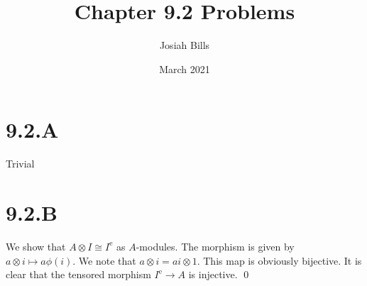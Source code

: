 \documentclass{article}
\title{Chapter 9.2 Problems}
\author{Josiah Bills}
\date{March 2021}
\begin{document}
\maketitle

\section{9.2.A}
Trivial

\section{9.2.B}
We show that $A \otimes I \cong I^{\text{e}}$ as $A$-modules. The
morphism is given by $a \otimes i \mapsto a\phi(i)$. We note that
$a \otimes i = ai \otimes 1$. This map is obviously bijective. It is clear that the
tensored morphism $I^{\text{e}} \to A$ is injective. \qed
\end{document}

